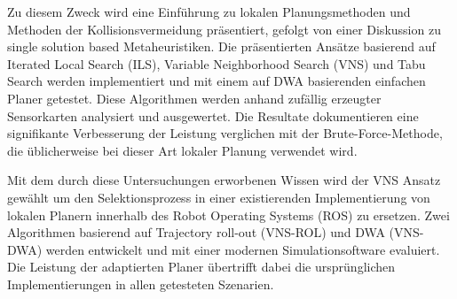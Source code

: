 Zu diesem Zweck wird eine Einf\"uhrung zu lokalen Planungsmethoden und Methoden der Kollisionsvermeidung pr\"asentiert, gefolgt von einer Diskussion zu \glqq single solution based\grqq{} Metaheuristiken. 
Die pr\"asentierten Ans\"atze basierend auf Iterated Local Search (ILS), Variable Neighborhood Search (VNS) und Tabu Search werden implementiert und mit einem auf DWA basierenden einfachen Planer getestet. 
Diese Algorithmen werden anhand zuf\"allig erzeugter Sensorkarten analysiert und ausgewertet. 
Die Resultate dokumentieren eine signifikante Verbesserung der Leistung verglichen mit der Brute-Force-Methode, die \"ublicherweise bei dieser Art lokaler Planung verwendet wird.

Mit dem durch diese Untersuchungen erworbenen Wissen wird der VNS Ansatz gew\"ahlt um den Selektionsprozess in einer existierenden Implementierung von lokalen Planern innerhalb des Robot Operating Systems (ROS) zu ersetzen. 
Zwei Algorithmen basierend auf Trajectory roll-out (VNS-ROL) und DWA (VNS-DWA) werden entwickelt und mit einer modernen Simulationsoftware evaluiert. 
Die Leistung der adaptierten Planer \"ubertrifft dabei die urspr\"unglichen Implementierungen in allen getesteten Szenarien. 

\endgroup			

\vfill